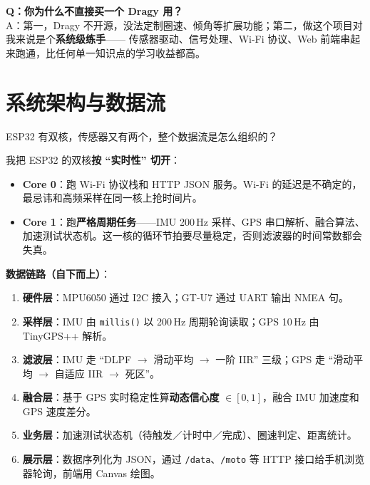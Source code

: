 \documentclass[UTF8,11pt,a4paper]{ctexart}
\begin{document}
\begin{followup}
\textbf{Q：你为什么不直接买一个 Dragy 用？}\\
A：第一，Dragy 不开源，没法定制圈速、倾角等扩展功能；第二，做这个项目对我来说是个\textbf{系统级练手}——
传感器驱动、信号处理、Wi-Fi 协议、Web 前端串起来跑通，比任何单一知识点的学习收益都高。
\end{followup}

\section{系统架构与数据流}

\begin{interviewer}
ESP32 有双核，传感器又有两个，整个数据流是怎么组织的？
\end{interviewer}

\begin{candidate}
我把 ESP32 的双核\textbf{按 ``实时性'' 切开}：
\begin{itemize}[leftmargin=1.4em,topsep=2pt,itemsep=2pt]
  \item \textbf{Core 0}：跑 Wi-Fi 协议栈和 HTTP JSON 服务。Wi-Fi 的延迟是不确定的，
        最忌讳和高频采样在同一核上抢时间片。
  \item \textbf{Core 1}：跑\textbf{严格周期任务}——IMU 200\,Hz 采样、GPS 串口解析、融合算法、
        加速测试状态机。这一核的循环节拍要尽量稳定，否则滤波器的时间常数都会失真。
\end{itemize}

\medskip
\textbf{数据链路（自下而上）}：
\begin{enumerate}[leftmargin=1.4em,topsep=2pt,itemsep=2pt]
  \item \textbf{硬件层}：MPU6050 通过 I2C 接入；GT-U7 通过 UART 输出 NMEA 句。
  \item \textbf{采样层}：IMU 由 \texttt{millis()} 以 200\,Hz 周期轮询读取；GPS 10\,Hz 由 TinyGPS++ 解析。
  \item \textbf{滤波层}：IMU 走 ``DLPF $\to$ 滑动平均 $\to$ 一阶 IIR'' 三级；GPS 走 ``滑动平均 $\to$ 自适应 IIR $\to$ 死区''。
  \item \textbf{融合层}：基于 GPS 实时稳定性算\textbf{动态信心度} $\in [0,1]$，融合 IMU 加速度和 GPS 速度差分。
  \item \textbf{业务层}：加速测试状态机（待触发／计时中／完成）、圈速判定、距离统计。
  \item \textbf{展示层}：数据序列化为 JSON，通过 \texttt{/data}、\texttt{/moto} 等 HTTP 接口给手机浏览器轮询，前端用 Canvas 绘图。
\end{enumerate}
\end{candidate}
\end{document}
